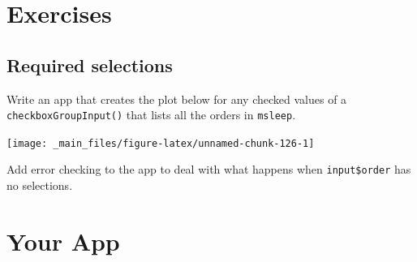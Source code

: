 \documentclass[
  oneside]{book}
\newenvironment{Shaded}{\begin{snugshade}}{\end{snugshade}}
\newcommand{\AttributeTok}[1]{\textcolor[rgb]{0.77,0.63,0.00}{#1}}
\newcommand{\CommentTok}[1]{\textcolor[rgb]{0.56,0.35,0.01}{\textit{#1}}}
\newcommand{\DecValTok}[1]{\textcolor[rgb]{0.00,0.00,0.81}{#1}}
\newcommand{\FunctionTok}[1]{\textcolor[rgb]{0.00,0.00,0.00}{#1}}
\newcommand{\NormalTok}[1]{#1}
\newcommand{\OtherTok}[1]{\textcolor[rgb]{0.56,0.35,0.01}{#1}}
\newcommand{\SpecialCharTok}[1]{\textcolor[rgb]{0.00,0.00,0.00}{#1}}
\newcommand{\StringTok}[1]{\textcolor[rgb]{0.31,0.60,0.02}{#1}}
\begin{document}
\hypertarget{exercises-debugging}{%
\section{Exercises}\label{exercises-debugging}}

\hypertarget{required-selections}{%
\subsection*{Required selections}\label{required-selections}}

Write an app that creates the plot below for any checked values of a \texttt{checkboxGroupInput}\texttt{()} that lists all the orders in \texttt{msleep}.

\begin{Shaded}
\end{Shaded}

\begin{center}\texttt{[image: \_main\_files/figure-latex/unnamed-chunk-126-1]} \end{center}

Add error checking to the app to deal with what happens when \texttt{input\$order} has no selections.

\hypertarget{your-app-debugging}{%
\section{Your App}\label{your-app-debugging}}
\end{document}
